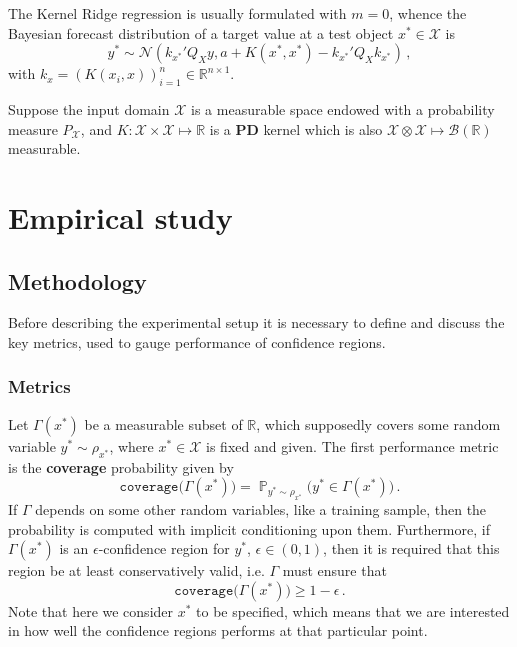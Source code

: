 \documentclass[a4paper,14pt]{article}
\newcommand{\pr}{\mathop{\mathbb{P}}\nolimits}
\newcommand{\Ncal}{\mathcal{N}}
\newcommand{\Xcal}{\mathcal{X}}
\newcommand{\Real}{\mathbb{R}}
\begin{document}
The Kernel Ridge regression is usually formulated with $m=0$, whence the Bayesian
forecast distribution of a target value at a test object $x^*\in \Xcal$ is 
$$ y^* \sim \Ncal(k_{x^*}'Q_X y, a + K(x^*, x^*) - k_{x^*}'Q_X k_{x^*}) \,, $$
with $k_x = (K(x_i, x))_{i=1}^n\in\Real^{n\times1}$.



Suppose the input domain $\Xcal$ is a measurable space endowed with a probability
measure $P_\Xcal$, and $K : \Xcal \times \Xcal \mapsto \Real$ is a \textbf{PD}
kernel which is also $\Xcal \otimes \Xcal \mapsto \mathcal{B}(\Real)$ measurable.



\section{Empirical study} %
\label{sec:empirical_study}

\subsection{Methodology} %
\label{sub:methodology}

Before describing the experimental setup it is necessary to define and discuss the key
metrics, used to gauge performance of confidence regions.

\subsubsection{Metrics} %
\label{ssub:metrics}

Let $\Gamma(x^*)$ be a measurable subset of $\Real$, which supposedly covers some
random variable $y^*\sim \rho_{x^*}$, where $x^*\in \Xcal$ is fixed and given. The first
performance metric is the \textbf{coverage} probability given by
$$ \mathtt{coverage}\bigl(\Gamma(x^*)\bigr)
  = \pr_{y^*\sim\rho_{x^*}}\bigl(y^*\in \Gamma(x^*)\bigr)
  \,. $$
If $\Gamma$ depends on some other random variables, like a training sample, then
the probability is computed with implicit conditioning upon them. Furthermore, if
$\Gamma(x^*)$ is an $\epsilon$-confidence region for $y^*$, $\epsilon\in(0, 1)$,
then it is required that this region be at least conservatively valid, i.e.
$\Gamma$ must ensure that
$$ \mathtt{coverage}\bigl(\Gamma(x^*)\bigr) \geq 1-\epsilon \,. $$
Note that here we consider $x^*$ to be specified, which means that we are interested
in how well the confidence regions performs at that particular point.
\end{document}
